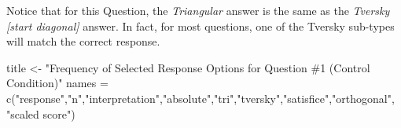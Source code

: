 \documentclass[
  letterpaper,
  DIV=11,
  numbers=noendperiod]{scrreprt}
\newenvironment{Shaded}{\begin{snugshade}}{\end{snugshade}}
\newcommand{\FunctionTok}[1]{\textcolor[rgb]{0.28,0.35,0.67}{#1}}
\newcommand{\NormalTok}[1]{\textcolor[rgb]{0.00,0.23,0.31}{#1}}
\newcommand{\OtherTok}[1]{\textcolor[rgb]{0.00,0.23,0.31}{#1}}
\newcommand{\StringTok}[1]{\textcolor[rgb]{0.13,0.47,0.30}{#1}}
\begin{document}
Notice that for this Question, the \emph{Triangular} answer is the same
as the \emph{Tversky {[}start diagonal{]}} answer. In fact, for most
questions, one of the Tversky sub-types will match the correct response.

\begin{Shaded}
\begin{Highlighting}[]
\NormalTok{title }\OtherTok{\textless{}{-}} \StringTok{"Frequency of Selected Response Options for Question \#1 (Control Condition)"}
\NormalTok{names }\OtherTok{=} \FunctionTok{c}\NormalTok{(}\StringTok{"response"}\NormalTok{,}\StringTok{"n"}\NormalTok{,}\StringTok{"interpretation"}\NormalTok{,}\StringTok{"absolute"}\NormalTok{,}\StringTok{"tri"}\NormalTok{,}\StringTok{"tversky"}\NormalTok{,}\StringTok{"satisfice"}\NormalTok{,}\StringTok{"orthogonal"}\NormalTok{, }\StringTok{"scaled score"}\NormalTok{)}


\end{Highlighting}
\end{Shaded}
\end{document}
